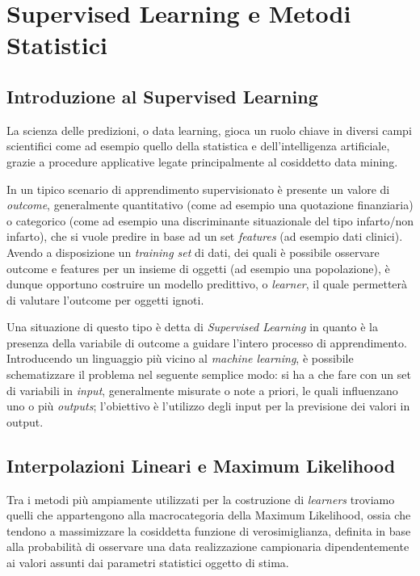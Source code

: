 \documentclass[12pt,openright,twoside,a4paper]{book}
\begin{document}
\frontmatter
\tableofcontents
\mainmatter

\chapter{Supervised Learning e Metodi Statistici}

\section{Introduzione al Supervised Learning}
La scienza delle predizioni, o data learning, gioca un ruolo chiave in diversi campi scientifici come ad esempio quello della statistica e dell'intelligenza artificiale, grazie a procedure applicative legate principalmente al cosiddetto data mining.

In un tipico scenario di apprendimento supervisionato è presente un valore di \textit{outcome}, generalmente quantitativo (come ad esempio una quotazione finanziaria) o categorico (come ad esempio una discriminante situazionale del tipo infarto/non infarto), che si vuole predire in base ad un set \textit{features} (ad esempio dati clinici).
Avendo a disposizione un \textit{training set} di dati, dei quali è possibile osservare outcome e features per un insieme di oggetti (ad esempio una popolazione), è dunque opportuno costruire un modello predittivo, o \textit{learner}, il quale permetterà di valutare l'outcome per oggetti ignoti.

Una situazione di questo tipo è detta di \textit{Supervised Learning} in quanto è la presenza della variabile di outcome a guidare l'intero processo di apprendimento.
Introducendo un linguaggio più vicino al \textit{machine learning}, è possibile schematizzare il problema nel seguente semplice modo: si ha a che fare con un set di variabili in \textit{input}, generalmente misurate o note a priori, le quali influenzano uno o più \textit{outputs}; l'obiettivo è l'utilizzo degli input per la previsione dei valori in output.

\section{Interpolazioni Lineari e Maximum Likelihood}
Tra i metodi più ampiamente utilizzati per la costruzione di \textit{learners} troviamo quelli che appartengono alla macrocategoria della Maximum Likelihood, ossia che tendono a massimizzare la cosiddetta funzione di verosimiglianza, definita in base alla probabilità di osservare una data realizzazione campionaria dipendentemente ai valori assunti dai parametri statistici oggetto di stima.
\end{document}
